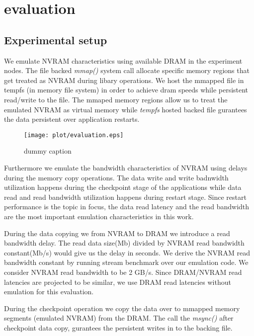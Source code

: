\section{evaluation}

\subsection{Experimental setup}
We emulate NVRAM characteristics using available DRAM in the experiment nodes.
The file backed \textit{ mmap()} system call allocate specific memory regions that
get treated as NVRAM during libary operations. We host the mmapped file in tempfs (in memory file system) 
in order to achieve dram speeds while persistent read/write to the file. The mmaped memory regions allow us 
to treat the emulated NVRAM as virtual memory while \textit{tempfs} hosted backed file
gurantees the data persistent over application restarts.  


\begin{figure}[ht]
\centering
\texttt{[image: plot/evaluation.eps]}
\caption{dummy caption}
\label{fig:evaluation1}
\end{figure}

Furthermore we emulate the bandwidth characteristics of NVRAM using delays during the memory copy operations.
The data write and write badnwidth utilization happens during
the checkpoint stage of the applications while data read and read bandwidth utilization happens during restart stage.
Since restart performance is the topic in focus, the data read latency and the read bandwidth
are the most important emulation characteristics in this work. 

During the data copying we from NVRAM to DRAM we introduce a read bandwidth delay. The read data size(Mb) divided by 
NVRAM read bandwidth constant(Mb/s) would give us the delay in seconds. We derive the NVRAM read bandwidth constant
by running stream benchmark over our emulation code. We consider NVRAM read bandwidth to be 2 GB/s. Since DRAM/NVRAM
read latencies are projected to be similar, we use DRAM read latencies without emulation for this evaluation.

During the checkpoint operation we copy the data over to mmapped memory segments (emulated NVRAM) from the DRAM.
The call the \textit{msync()} after checkpoint data copy, gurantees the persistent writes in to the backing file.


